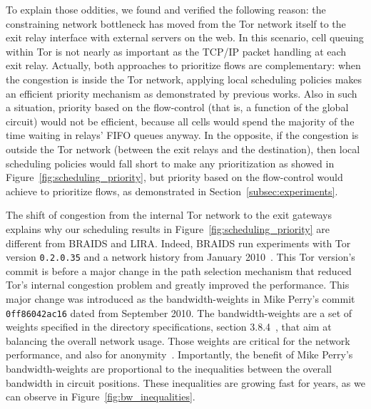 To explain those oddities, we found and verified the following reason: the 
constraining network bottleneck has moved from the
Tor network itself to the exit relay interface with external servers on the
web. In this scenario, cell queuing within Tor is not nearly as important as the
TCP/IP packet handling at each exit relay. Actually, both approaches to prioritize 
flows are complementary: when the congestion is inside the Tor network, applying 
local scheduling policies makes an efficient priority mechanism as demonstrated by previous works. Also in such a situation, priority 
based on the flow-control (that is, a function of the global circuit) would not be 
efficient, because all cells would spend the majority of the time waiting in 
relays' FIFO queues anyway. In the opposite, if the congestion is outside the Tor 
network (between the exit relays and the destination), then local scheduling 
policies would fall short to make any prioritization as showed in Figure~\ref{fig:scheduling_priority}, but priority based on the 
flow-control would achieve to prioritize flows, as demonstrated in Section~\ref{subsec:experiments}. 

The shift of congestion from the internal Tor network to the exit gateways explains why our scheduling results in Figure~\ref{fig:scheduling_priority} are different from BRAIDS
and LIRA. Indeed, BRAIDS run experiments with Tor version \texttt{0.2.0.35} and a network history
from January 2010~\cite{braids-repository}. This Tor version's commit is
before a major change in the path selection mechanism that reduced Tor's
internal congestion problem and greatly improved the performance. This major change
was introduced as the bandwidth-weights in Mike Perry's commit \texttt{0ff86042ac16}
dated from September 2010. The bandwidth-weights are a set of weights specified
in the directory specifications, section 3.8.4~\cite{dirspec}, that aim at
balancing the overall network usage. Those weights are
critical for the network performance, and also for
anonymity~\cite{waterfilling-pets2017, wf_proposal}. Importantly, the benefit
of Mike Perry's bandwidth-weights are proportional to the inequalities between
the overall bandwidth in circuit positions. These inequalities are growing fast for years, as we can observe in Figure~\ref{fig:bw_inequalities}.

